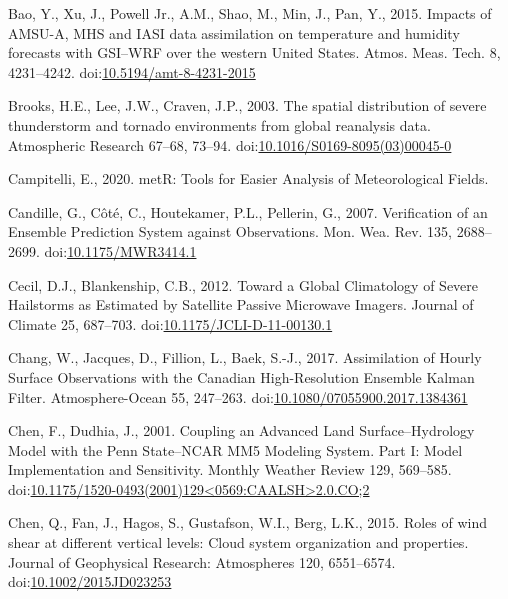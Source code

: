 \documentclass[final,5p,times,twocolumn,authoryear]{elsarticle} %
\begin{document}
\leavevmode\hypertarget{ref-bao2015}{}%
Bao, Y., Xu, J., Powell Jr., A.M., Shao, M., Min, J., Pan, Y., 2015. Impacts of AMSU-A, MHS and IASI data assimilation on temperature and humidity forecasts with GSI--WRF over the western United States. Atmos. Meas. Tech. 8, 4231--4242. doi:\href{https://doi.org/10.5194/amt-8-4231-2015}{10.5194/amt-8-4231-2015}

\leavevmode\hypertarget{ref-brooks2003}{}%
Brooks, H.E., Lee, J.W., Craven, J.P., 2003. The spatial distribution of severe thunderstorm and tornado environments from global reanalysis data. Atmospheric Research 67--68, 73--94. doi:\href{https://doi.org/10.1016/S0169-8095(03)00045-0}{10.1016/S0169-8095(03)00045-0}

\leavevmode\hypertarget{ref-campitelli2020}{}%
Campitelli, E., 2020. metR: Tools for Easier Analysis of Meteorological Fields.

\leavevmode\hypertarget{ref-candille2007}{}%
Candille, G., Côté, C., Houtekamer, P.L., Pellerin, G., 2007. Verification of an Ensemble Prediction System against Observations. Mon. Wea. Rev. 135, 2688--2699. doi:\href{https://doi.org/10.1175/MWR3414.1}{10.1175/MWR3414.1}

\leavevmode\hypertarget{ref-cecil2012}{}%
Cecil, D.J., Blankenship, C.B., 2012. Toward a Global Climatology of Severe Hailstorms as Estimated by Satellite Passive Microwave Imagers. Journal of Climate 25, 687--703. doi:\href{https://doi.org/10.1175/JCLI-D-11-00130.1}{10.1175/JCLI-D-11-00130.1}

\leavevmode\hypertarget{ref-chang2017}{}%
Chang, W., Jacques, D., Fillion, L., Baek, S.-J., 2017. Assimilation of Hourly Surface Observations with the Canadian High-Resolution Ensemble Kalman Filter. Atmosphere-Ocean 55, 247--263. doi:\href{https://doi.org/10.1080/07055900.2017.1384361}{10.1080/07055900.2017.1384361}

\leavevmode\hypertarget{ref-chen2001}{}%
Chen, F., Dudhia, J., 2001. Coupling an Advanced Land Surface--Hydrology Model with the Penn State--NCAR MM5 Modeling System. Part I: Model Implementation and Sensitivity. Monthly Weather Review 129, 569--585. doi:\href{https://doi.org/10.1175/1520-0493(2001)129\%3C0569:CAALSH\%3E2.0.CO;2}{10.1175/1520-0493(2001)129\textless0569:CAALSH\textgreater2.0.CO;2}

\leavevmode\hypertarget{ref-chen2015}{}%
Chen, Q., Fan, J., Hagos, S., Gustafson, W.I., Berg, L.K., 2015. Roles of wind shear at different vertical levels: Cloud system organization and properties. Journal of Geophysical Research: Atmospheres 120, 6551--6574. doi:\href{https://doi.org/10.1002/2015JD023253}{10.1002/2015JD023253}
\end{document}
